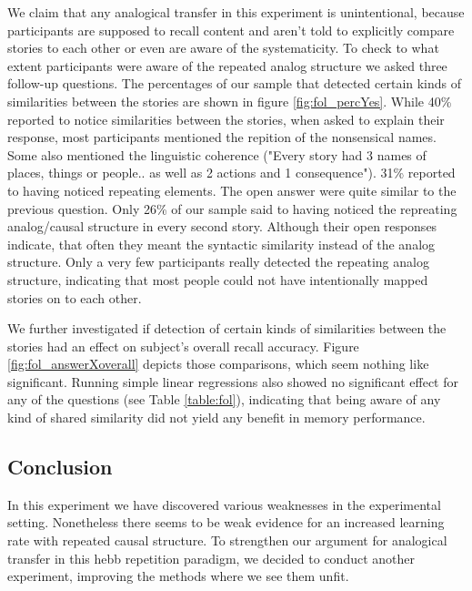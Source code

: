 \documentclass[a4paper,man,natbib,floatsintext,import]{apa6}
\begin{document}
We claim that any analogical transfer in this experiment is unintentional, because participants are supposed to recall content and aren't told to explicitly compare stories to each other or even are aware of the systematicity. To check to what extent participants were aware of the repeated analog structure we asked three follow-up questions. The percentages of our sample that detected certain kinds of similarities between the stories are shown in figure \ref{fig:fol_percYes}. While 40\% reported to notice similarities between the stories, when asked to explain their response, most participants mentioned the repition of the nonsensical names. Some also mentioned the linguistic coherence ("Every story had 3 names of places, things or people.. as well as 2 actions and 1 consequence"). 31\% reported to having noticed repeating elements. The open answer were quite similar to the previous question. Only 26\% of our sample said to having noticed the repreating analog/causal structure in every second story. Although their open responses indicate, that often they meant the syntactic similarity instead of the analog structure. Only a very few participants really detected the repeating analog structure, indicating that most people could not have intentionally mapped stories on to each other.

We further investigated if detection of certain kinds of similarities between the stories had an effect on subject's overall recall accuracy. Figure \ref{fig:fol_answerXoverall} depicts those comparisons, which seem nothing like significant. Running simple linear regressions also showed no significant effect for any of the questions (see Table \ref{table:fol}), indicating that being aware of any kind of shared similarity did not yield any benefit in memory performance.



\subsection{Conclusion}
In this experiment we have discovered various weaknesses in the experimental setting. Nonetheless there seems to be weak evidence for an increased learning rate with repeated causal structure. To strengthen our argument for analogical transfer in this hebb repetition paradigm, we decided to conduct another experiment, improving the methods where we see them unfit.

\newpage
\end{document}
